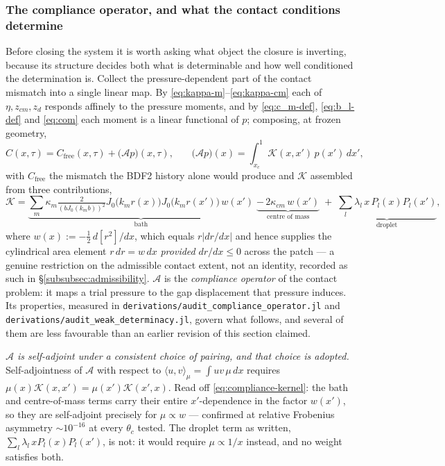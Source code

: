 \subsubsection{The compliance operator, and what the contact conditions determine}
\label{subsubsec:compliance}
\hspace*{1em}Before closing the system it is worth asking what object the closure is inverting, because its structure decides both what is determinable and how well conditioned the determination is. Collect the pressure-dependent part of the contact mismatch into a single linear map. By \eqref{eq:kappa-m}--\eqref{eq:kappa-cm} each of $\eta,z_{cm},z_d$ responds affinely to the pressure moments, and by \eqref{eq:c_m-def}, \eqref{eq:b_l-def} and \eqref{eq:com} each moment is a linear functional of $p$; composing, at frozen geometry,
\begin{equation}
    C(x,\tau) = C_{\text{free}}(x,\tau) + \big(\mathcal A p\big)(x,\tau)\text{,}\qquad
    \big(\mathcal A p\big)(x) = \int_{x_c}^1 \mathcal K(x,x')\,p(x')\,dx'\text{,}
    \label{eq:compliance-def}
\end{equation}
with $C_{\text{free}}$ the mismatch the BDF2 history alone would produce and $\mathcal K$ assembled from three contributions,
\begin{equation}
    \mathcal K = \underbrace{\sum_{m}\kappa_m\tfrac{2}{(bJ_0(k_mb))^2}J_0\big(k_mr(x)\big)J_0\big(k_mr(x')\big)\,w(x')}_{\text{bath}}
    \;\underbrace{-\,2\kappa_{cm}\,w(x')}_{\text{centre of mass}}
    \;+\;\underbrace{\sum_l\lambda_l\,x\,P_l(x)P_l(x')}_{\text{droplet}}\text{,}
    \label{eq:compliance-kernel}
\end{equation}
where $w(x):=-\tfrac12\,d[r^2]/dx$, which equals $r|dr/dx|$ and hence supplies the cylindrical area element $r\,dr=w\,dx$ \emph{provided} $dr/dx\le0$ across the patch --- a genuine restriction on the admissible contact extent, not an identity, recorded as such in \S\ref{subsubsec:admissibility}. $\mathcal A$ is the \emph{compliance operator} of the contact problem: it maps a trial pressure to the gap displacement that pressure induces. Its properties, measured in \texttt{derivations/audit\_compliance\_operator.jl} and \texttt{derivations/audit\_weak\_determinacy.jl}, govern what follows, and several of them are less favourable than an earlier revision of this section claimed.

\emph{$\mathcal A$ is self-adjoint under a consistent choice of pairing, and that choice is adopted.} Self-adjointness of $\mathcal A$ with respect to $\langle u,v\rangle_\mu=\int uv\,\mu\,dx$ requires $\mu(x)\mathcal K(x,x')=\mu(x')\mathcal K(x',x)$. Read off \eqref{eq:compliance-kernel}: the bath and centre-of-mass terms carry their entire $x'$-dependence in the factor $w(x')$, so they are self-adjoint precisely for $\mu\propto w$ --- confirmed at relative Frobenius asymmetry $\sim10^{-16}$ at every $\theta_c$ tested. The droplet term as written, $\sum_l\lambda_l\,xP_l(x)P_l(x')$, is not: it would require $\mu\propto1/x$ instead, and no weight satisfies both.

